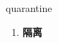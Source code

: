 
\begin{frame}
{\huge quarantine}
\begin{center}
\begin{enumerate}\Large
  \item \textbf{隔离}
\end{enumerate}
\end{center}
\end{frame}
